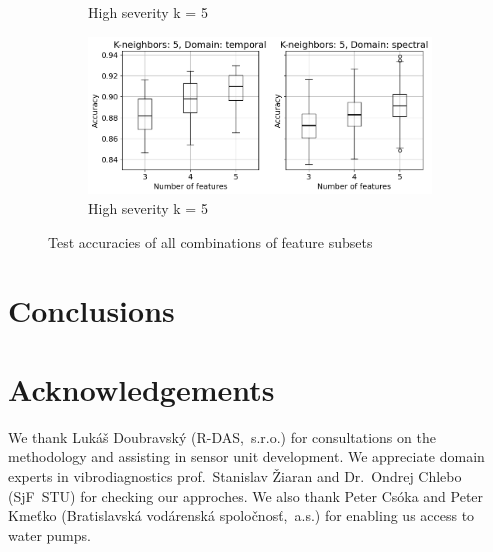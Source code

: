 \documentclass{llncs}
\begin{document}
\begin{figure}
\begin{subfigure}[b]{0.45\textwidth}
         \caption{High severity k = 5}
     \end{subfigure}
     \hfill
     \begin{subfigure}[b]{0.45\textwidth}
         \centering
         \includegraphics[width=\textwidth]{fig/combinations-mafaulda/all-axis-severity-k5.png}
         \caption{High severity k = 5}
     \end{subfigure}
     \caption{Test accuracies of all combinations of feature subsets}
\end{figure}



\section{Conclusions}


\section*{Acknowledgements}
We thank Lukáš Doubravský (R-DAS,~s.r.o.) for consultations on the methodology and assisting in sensor unit development. We appreciate domain experts in vibrodiagnostics prof.~Stanislav Žiaran and Dr.~Ondrej Chlebo (SjF~STU) for checking our approches. We also thank Peter Csóka and Peter Kmeťko (Bratislavská vodárenská spoločnosť,~a.s.) for enabling us access to water pumps.

\printbibliography
\end{document}
